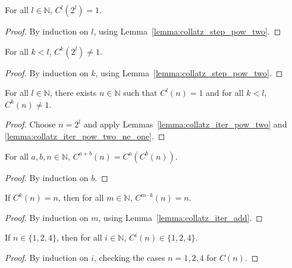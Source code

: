 \begin{lemma}\label{lemma:collatz_iter_pow_two}\leanok
For all $l \in \mathbb{N}$, $C^l(2^l) = 1$.
\end{lemma}
\begin{proof}\leanok
By induction on $l$, using Lemma~\ref{lemma:collatz_step_pow_two}.
\end{proof}

\begin{lemma}\label{lemma:collatz_iter_pow_two_ne_one}\leanok
For all $k < l$, $C^k(2^l) \neq 1$.
\end{lemma}
\begin{proof}\leanok
By induction on $k$, using Lemma~\ref{lemma:collatz_step_pow_two}.
\end{proof}

\begin{lemma}\label{lemma:exists_collatz_reverse_strict}\leanok
For all $l \in \mathbb{N}$, there exists $n \in \mathbb{N}$ such that $C^l(n) = 1$ and for all $k < l$, $C^k(n) \neq 1$.
\end{lemma}
\begin{proof}\leanok
Choose $n = 2^l$ and apply Lemmas~\ref{lemma:collatz_iter_pow_two} and \ref{lemma:collatz_iter_pow_two_ne_one}.
\end{proof}

\begin{lemma}\label{lemma:collatz_iter_add}\leanok
For all $a, b, n \in \mathbb{N}$, $C^{a+b}(n) = C^a(C^b(n))$.
\end{lemma}
\begin{proof}\leanok
By induction on $b$.
\end{proof}

\begin{lemma}\label{lemma:collatz_iter_mul_cycle}\leanok
If $C^k(n) = n$, then for all $m \in \mathbb{N}$, $C^{m \cdot k}(n) = n$.
\end{lemma}
\begin{proof}\leanok
By induction on $m$, using Lemma~\ref{lemma:collatz_iter_add}.
\end{proof}

\begin{lemma}\label{lemma:collatz_iter_mem_124}\leanok
If $n \in \{1, 2, 4\}$, then for all $i \in \mathbb{N}$, $C^i(n) \in \{1, 2, 4\}$.
\end{lemma}
\begin{proof}\leanok
By induction on $i$, checking the cases $n=1, 2, 4$ for $C(n)$.
\end{proof}


